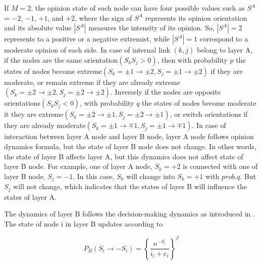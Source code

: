 \documentclass[english]{cccconf}
\begin{document}
If $M = 2$, the opinion state of each node can have four possible values such as $S^A$ = $-2$, $-1$, $+1$, and $+2$, where the sign of $S^A$ represents its opinion orientation and its absolute value $|S^A|$ measures the intensity of its opinion. So, $|S^A|=2$ represents to a positive or a negative extremist, while  $|S^A|=1$ correspond to a moderate opinion of each side. In case of internal link $(k, j)$ belong to layer A, if the nodes are the same orientation$(S_kS_j>0)$, then with probability $p$ the states of nodes become extreme$(S_k=\pm1 \rightarrow \pm2, S_j= \pm1 \rightarrow \pm2)$ if they are moderate, or remain extreme if they are already extreme$(S_k=\pm2 \rightarrow \pm2, S_j= \pm2 \rightarrow \pm2)$. Inversely if the nodes are opposite orientations$(S_kS_j<0)$, with probability $q$ the states of nodes become moderate it they are extreme$(S_k=\pm2 \rightarrow \pm1, S_j= \pm2 \rightarrow \pm1)$, or switch orientations if they are already moderate$(S_k=\pm1 \rightarrow \mp1, S_j= \pm1 \rightarrow \mp1)$.  In case of interaction between layer A node and layer B node, layer A node follows opinion dynamics formula, but the state of layer B node does not change. In other words, the state of layer B affects layer A, but this dynamics does not affect state of layer B node. For example, one of layer A node, $S_k = +2$ is connected with one of layer B node, $S_j = -1$. In this case, $S_k$ will change into $S_k = +1$ with $prob.q$. But $S_j$ will not change, which indicates that the states of layer B will influence the states of layer A.

The dynamics of layer B follows the decision-making dynamics as introduced in \cite{abrams2003, vazquez2010}. The state of node i in layer B updates according to

\begin{equation}
P_B(S_i \rightarrow -S_i)= \left \{\frac{n^{-S_i}}{i_i + e_i}\right \}^\beta
\end{equation}
\end{document}
